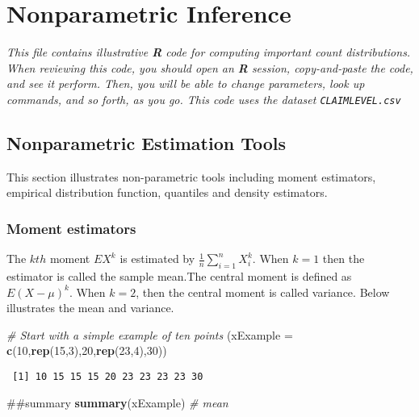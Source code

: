 \documentclass[]{book}
\newenvironment{Shaded}{\begin{snugshade}}{\end{snugshade}}
\newcommand{\KeywordTok}[1]{\textcolor[rgb]{0.13,0.29,0.53}{\textbf{#1}}}
\newcommand{\DataTypeTok}[1]{\textcolor[rgb]{0.13,0.29,0.53}{#1}}
\newcommand{\DecValTok}[1]{\textcolor[rgb]{0.00,0.00,0.81}{#1}}
\newcommand{\CommentTok}[1]{\textcolor[rgb]{0.56,0.35,0.01}{\textit{#1}}}
\newcommand{\NormalTok}[1]{#1}
\theoremstyle{definition}
\theoremstyle{definition}
\theoremstyle{definition}
\theoremstyle{remark}
\begin{document}
\section{Nonparametric Inference}\label{nonparametric-inference}

\emph{This file contains illustrative \textbf{R} code for computing
important count distributions. When reviewing this code, you should open
an \textbf{R} session, copy-and-paste the code, and see it perform.
Then, you will be able to change parameters, look up commands, and so
forth, as you go. This code uses the dataset \texttt{CLAIMLEVEL.csv}}

\subsection{Nonparametric Estimation
Tools}\label{nonparametric-estimation-tools}

This section illustrates non-parametric tools including moment
estimators, empirical distribution function, quantiles and density
estimators.

\subsubsection{Moment estimators}\label{moment-estimators}

The \(kth\) moment \(EX^k\) is estimated by
\(\frac{1}{n}\sum_{i=1}^{n}X_i^k\). When \(k=1\) then the estimator is
called the sample mean.The central moment is defined as \(E(X-\mu)^k\).
When \(k=2\), then the central moment is called variance. Below
illustrates the mean and variance.

\begin{Shaded}
\begin{Highlighting}[]
\CommentTok{# Start with a simple example of ten points}
\NormalTok{(}\DataTypeTok{xExample =} \KeywordTok{c}\NormalTok{(}\DecValTok{10}\NormalTok{,}\KeywordTok{rep}\NormalTok{(}\DecValTok{15}\NormalTok{,}\DecValTok{3}\NormalTok{),}\DecValTok{20}\NormalTok{,}\KeywordTok{rep}\NormalTok{(}\DecValTok{23}\NormalTok{,}\DecValTok{4}\NormalTok{),}\DecValTok{30}\NormalTok{))}
\end{Highlighting}
\end{Shaded}

\begin{verbatim}
 [1] 10 15 15 15 20 23 23 23 23 30
\end{verbatim}

\begin{Shaded}
\begin{Highlighting}[]
\NormalTok{##summary}
\KeywordTok{summary}\NormalTok{(xExample) }\CommentTok{# mean }
\end{Highlighting}
\end{Shaded}
\end{document}
